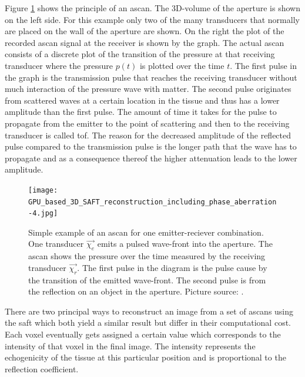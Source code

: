 Figure \ref{ascan_example} shows the principle of an \ac{ascan}. The 3D-volume of the aperture is shown on the left side. For this example only two of the many transducers that normally are placed on the wall of the aperture are shown. On the right the plot of the recorded \ac{ascan} signal at the receiver is shown by the graph. The actual \ac{ascan} consists of a discrete plot of the transition of the pressure at that receiving transducer where the pressure $p(t)$ is plotted over the time $t$. The first pulse in the graph is the transmission pulse that reaches the receiving transducer without much interaction of the pressure wave with matter. The second pulse originates from scattered waves at a certain location in the tissue and thus has a lower amplitude than the first pulse. The amount of time it takes for the pulse to propagate from the emitter to the point of scattering and then to the receiving transducer is called \ac{tof}. The reason for the decreased amplitude of the reflected pulse compared to the transmission pulse is the longer path that the wave has to propagate and as a consequence thereof the higher attenuation leads to the lower amplitude. 


\begin{figure}[H]
    \centering
    \texttt{[image: GPU\_based\_3D\_SAFT\_reconstruction\_including\_phase\_aberration-4.jpg]}
    \caption{ Simple example of an \ac{ascan} for one emitter-reciever combination. One transducer $\overrightarrow{\chi_e}$ emits a pulsed wave-front into the aperture. The \ac{ascan} shows the pressure over the time measured by the receiving transducer $\overrightarrow{\chi_r}$. The first pulse in the diagram is the pulse cause by the transition of the emitted wave-front. The second pulse is from the reflection on an object in the aperture. Picture source: \cite{Kretzek2014GPUAberration}. }
    \label{ascan_example}
\end{figure}

There are two principal ways to reconstruct an image from a set of \acp{ascan} using the \ac{saft} which both yield a similar result but differ in their computational cost. Each voxel eventually gets assigned a certain value which corresponds to the intensity of that voxel in the final image. The intensity represents the echogenicity of the tissue at this particular position and is proportional to the reflection coefficient.

\bigskip


